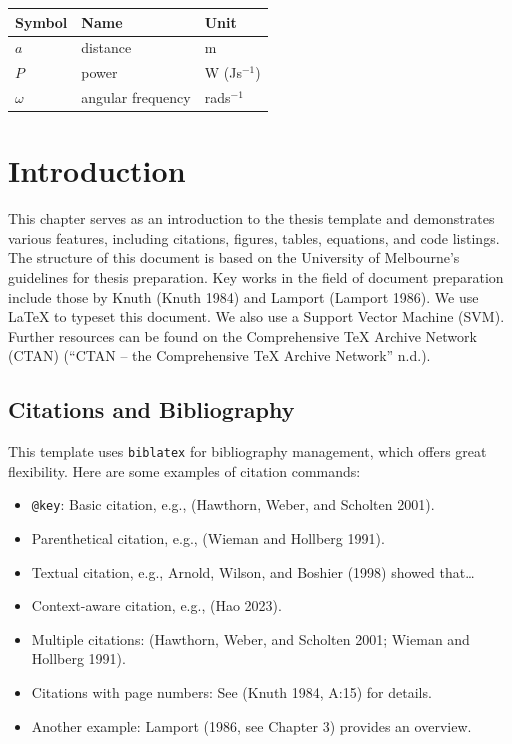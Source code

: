 \documentclass{article}
\begin{document}
\begin{longtable}[]{@{}lll@{}}
\toprule\noalign{}
Symbol & Name & Unit \\
\midrule\noalign{}
\endhead
\bottomrule\noalign{}
\endlastfoot
\(a\) & distance & m \\
\(P\) & power & W (Js\(^{-1}\)) \\
\(\omega\) & angular frequency & rads\(^{-1}\) \\
\end{longtable}


\chapter{Introduction}\label{ch-introduction}

This chapter serves as an introduction to the thesis template and
demonstrates various features, including citations, figures, tables,
equations, and code listings. The structure of this document is based on
the University of Melbourne's guidelines for thesis preparation. Key
works in the field of document preparation include those by Knuth (Knuth
1984) and Lamport (Lamport 1986). We use LaTeX to typeset this document.
We also use a Support Vector Machine (SVM). Further resources can be
found on the Comprehensive TeX Archive Network (CTAN) ({``CTAN -- the
Comprehensive TeX Archive Network''} n.d.).

\section{Citations and Bibliography}\label{sec-citations}

This template uses \texttt{biblatex} for bibliography management, which
offers great flexibility. Here are some examples of citation commands:

\begin{itemize}
\tightlist
\item
  \texttt{@key}: Basic citation, e.g., (Hawthorn, Weber, and Scholten
  2001).
\item
  Parenthetical citation, e.g., (Wieman and Hollberg 1991).
\item
  Textual citation, e.g., Arnold, Wilson, and Boshier (1998) showed
  that\ldots{}
\item
  Context-aware citation, e.g., (Hao 2023).
\item
  Multiple citations: (Hawthorn, Weber, and Scholten 2001; Wieman and
  Hollberg 1991).
\item
  Citations with page numbers: See (Knuth 1984, A:15) for details.
\item
  Another example: Lamport (1986, see Chapter 3) provides an overview.
\end{itemize}
\end{document}
